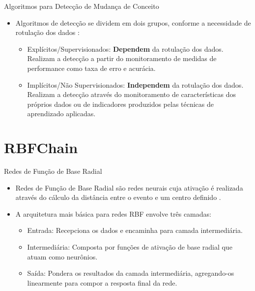 \documentclass[10pt]{beamer}
\begin{document}
\begin{frame}{Algoritmos para Detecção de Mudança de Conceito}
    \begin{itemize}
        \item<1 -> Algoritmos de detecção se dividem em dois grupos, conforme a necessidade de rotulação dos dados \cite{Zliobaite:2010}:
        \begin{itemize}
        \item<1 -> \alert{Explícitos/Supervisionados}: \textbf{Dependem} da rotulação dos dados. Realizam a detecção a partir do monitoramento de medidas de performance como taxa de erro e acurácia.
        \item<1 -> \alert{Implícitos/Não Supervisionados}: \textbf{Independem} da rotulação dos dados. Realizam a detecção através do monitoramento de características dos próprios dados ou de indicadores produzidos pelas técnicas de aprendizado aplicadas.
        \end{itemize}
    \end{itemize}
\end{frame}

\section{RBFChain}

\begin{frame}{Redes de Função de Base Radial}
    \begin{itemize}
        \item<1 -> \alert{Redes de Função de Base Radial} são redes neurais cuja ativação é realizada através do cálculo da distância entre o evento e um centro definido \cite{Braga:RedesNeuraisTeoriaAplicacoes}.
        \item<1 -> A arquitetura mais básica para redes RBF envolve três camadas:
        \begin{itemize}
            \item<1 -> \alert{Entrada}: Recepciona os dados e encaminha para camada intermediária.
            \item<1 -> \alert{Intermediária}: Composta por funções de ativação de base radial que atuam como neurônios.
            \item<1 -> \alert{Saída}: Pondera os resultados da camada intermediária, agregando-os linearmente para compor a resposta final da rede.
        \end{itemize}
      \end{itemize}
\end{frame}
\end{document}
